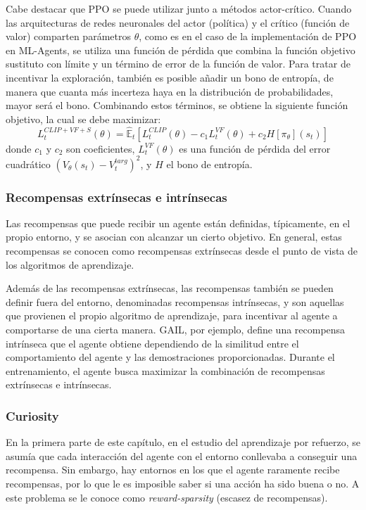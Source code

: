 Cabe destacar que PPO se puede utilizar junto a métodos actor-crítico. Cuando las arquitecturas de redes neuronales del actor (política) y el crítico (función de valor) comparten parámetros $\theta$, como es en el caso de la implementación de PPO en ML-Agents, se utiliza una función de pérdida que combina la función objetivo sustituto con límite y un término de error de la función de valor. Para tratar de incentivar la exploración, también es posible añadir un bono de entropía, de manera que cuanta más incerteza haya en la distribución de probabilidades, mayor será el bono. Combinando estos términos, se obtiene la siguiente función objetivo, la cual se debe maximizar:
\begin{equation}
    L_t^{CLIP+VF+S}(\theta) = \hat{\mathbb{E}}_t \left[ L_t^{CLIP}(\theta) - c_1 L_t^{V F}(\theta) + c_2 H[\pi_\theta](s_t) \right]
\end{equation}
donde $c_1$ y $c_2$ son coeficientes, $L_t^{VF}(\theta)$ es una función de pérdida del error cuadrático $(V_\theta(s_t)-V_t^{targ})^2$, y $H$ el bono de entropía.

\newpage

\subsubsection{Recompensas extrínsecas e intrínsecas}

Las recompensas que puede recibir un agente están definidas, típicamente, en el propio entorno, y se asocian con alcanzar un cierto objetivo. En general, estas recompensas se conocen como recompensas extrínsecas desde el punto de vista de los algoritmos de aprendizaje.

Además de las recompensas extrínsecas, las recompensas también se pueden definir fuera del entorno, denominadas recompensas intrínsecas, y son aquellas que provienen el propio algoritmo de aprendizaje, para incentivar al agente a comportarse de una cierta manera. GAIL, por ejemplo, define una recompensa intrínseca que el agente obtiene dependiendo de la similitud entre el comportamiento del agente y las demostraciones proporcionadas. Durante el entrenamiento, el agente busca maximizar la combinación de recompensas extrínsecas e intrínsecas.

\subsubsection{Curiosity}

En la primera parte de este capítulo, en el estudio del aprendizaje por refuerzo, se asumía que cada interacción del agente con el entorno conllevaba a conseguir una recompensa. Sin embargo, hay entornos en los que el agente raramente recibe recompensas, por lo que le es imposible saber si una acción ha sido buena o no. A este problema se le conoce como \emph{reward-sparsity} (escasez de recompensas).

